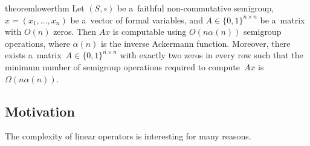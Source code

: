 \documentclass[11pt,letterpaper]{article}
\begin{document}
\begin{restatable}{theorem}{lowerthm}
\label{thm:lowerbound}
Let $(S, \circ)$ be a~faithful non-commutative semigroup, $x = (x_1,\ldots, x_n)$ be
a~vector of formal variables, and $A \in \{0,1\}^{n \times n}$
be a~matrix with $O(n)$ zeros. Then $Ax$ is computable
using $O(n\alpha(n))$ semigroup operations, where $\alpha(n)$
is the inverse Ackermann function. Moreover, there exists
a~matrix~$A \in \{0,1\}^{n \times n}$ with exactly two zeros
in every row such that the minimum number of semigroup 
operations
required to compute~$Ax$ is $\Omega(n\alpha(n))$.
\end{restatable}


\subsection{Motivation}
The complexity of linear operators is interesting for many reasons.
\end{document}
